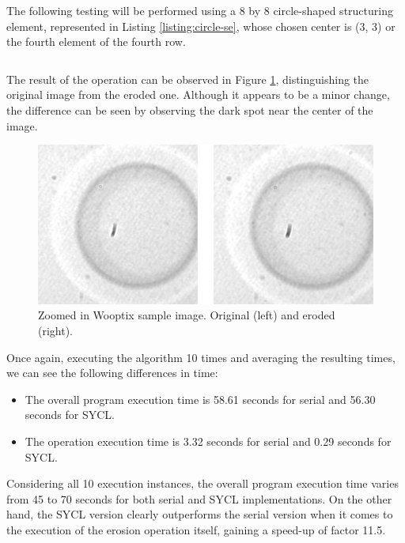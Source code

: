 The following testing will be performed using a 8 by 8 circle-shaped structuring element, represented in Listing \ref{listing:circle-se}, whose chosen center is (3, 3) or the fourth element of the fourth row.

\begin{tabular}{c}

\end{tabular}

The result of the operation can be observed in Figure \ref{fig:result-wooptix}, distinguishing the original image from the eroded one.
Although it appears to be a minor change, the difference can be seen by observing the dark spot near the center of the image.

\begin{figure}[H]
    \centering
    \includegraphics[width=0.7\linewidth]{images/comparison-wooptix.png}
    \caption{Zoomed in Wooptix sample image. Original (left) and eroded (right).}
    \label{fig:result-wooptix}
\end{figure}

Once again, executing the algorithm 10 times and averaging the resulting times, we can see the following differences in time:

\begin{itemize}
    \item The overall program execution time is 58.61 seconds for serial and 56.30 seconds for SYCL.
    \item The operation execution time is 3.32 seconds for serial and 0.29 seconds for SYCL.
\end{itemize}

Considering all 10 execution instances, the overall program execution time varies from 45 to 70 seconds for both serial and SYCL implementations.
On the other hand, the SYCL version clearly outperforms the serial version when it comes to the execution of the erosion operation itself, gaining a speed-up of factor 11.5.
